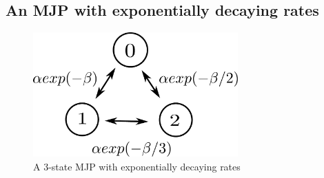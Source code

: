 
\subsection{An MJP with exponentially decaying rates}
  \begin{figure}[H]
  \centering
  \begin{minipage}[!hp]{0.45\linewidth}
  \centering
    \includegraphics [width=0.70\textwidth, angle=0]{figs/exp_model.pdf}
      \end{minipage}
    \caption{A 3-state MJP with exponentially decaying rates}
    \label{fig:exp_model}
  \end{figure}

